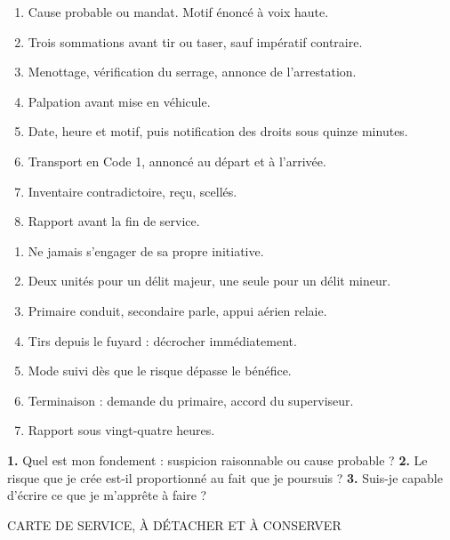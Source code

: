 
\begin{enumerate}[leftmargin=13mm]
  \item Cause probable ou mandat. Motif énoncé à voix haute.
  \item Trois sommations avant tir ou taser, sauf impératif contraire.
  \item Menottage, vérification du serrage, annonce de l'arrestation.
  \item Palpation avant mise en véhicule.
  \item Date, heure et motif, puis notification des droits sous quinze minutes.
  \item Transport en Code 1, annoncé au départ et à l'arrivée.
  \item Inventaire contradictoire, reçu, scellés.
  \item Rapport avant la fin de service.
\end{enumerate}


\begin{enumerate}[leftmargin=13mm]
  \item Ne jamais s'engager de sa propre initiative.
  \item Deux unités pour un délit majeur, une seule pour un délit mineur.
  \item Primaire conduit, secondaire parle, appui aérien relaie.
  \item Tirs depuis le fuyard : décrocher immédiatement.
  \item Mode suivi dès que le risque dépasse le bénéfice.
  \item Terminaison : demande du primaire, accord du superviseur.
  \item Rapport sous vingt-quatre heures.
\end{enumerate}

\begin{rappel}
\textbf{1.} Quel est mon fondement : suspicion raisonnable ou cause probable ?\quad
\textbf{2.} Le risque que je crée est-il proportionné au fait que je poursuis ?\quad
\textbf{3.} Suis-je capable d'écrire ce que je m'apprête à faire ?
\end{rappel}

\clearpage

\vspace{4mm}
\begin{center}
{\lspdsans\fontsize{8.4}{11}\selectfont\color{lspdgrey}%
  \MakeUppercase{Carte de service, à détacher et à conserver}}
\end{center}
\vspace{5mm}

